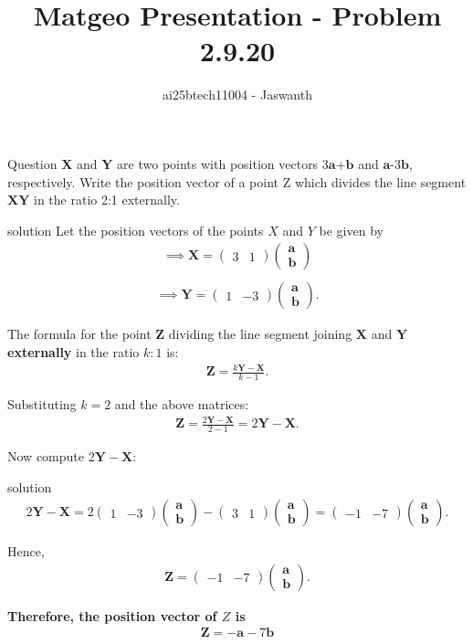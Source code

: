 \documentclass{beamer}
\title{Matgeo Presentation - Problem 2.9.20}
\author{ai25btech11004 - Jaswanth}
\numberwithin{equation}{section}
\theoremstyle{remark}
\newcommand{\myvec}[1]{\ensuremath{\begin{pmatrix}#1\end{pmatrix}}}
\let\vec\mathbf
\begin{document}
\frame{\titlepage}
\begin{frame}{Question}
$\vec{X}$ and  $\vec{Y}$ are two points with position vectors $3\vec{a}$+$\vec{b}$  and  $\vec{a}$-$3\vec{b}$, respectively. Write the position vector of a point Z  which divides the line segment  $\vec{XY}$ in the ratio 2:1 externally.\\
\end{frame}
\begin{frame}{solution}
Let the position vectors of the points $X$ and $Y$ be given by
\begin{align}
  \implies  \vec{X} = \myvec{3 & 1}
\myvec{\vec{a} \\ \vec{b}}\\
\end{align}
\begin{align}
\implies \vec{Y} = 
\myvec{1 & -3}
\myvec{\vec{a} \\ \vec{b}}.
\end{align}

\vspace{1em}

The formula for the point $\mathbf{Z}$ dividing the line segment joining $\vec{X}$ and $\vec{Y}$ \textbf{externally} in the ratio $k:1$ is:
\begin{align}
\vec{Z} = \frac{k\vec{Y} - \vec{X}}{k - 1}.
\end{align}

Substituting $k = 2$ and the above matrices:
\begin{align}
\vec{Z} = \frac{2\vec{Y} - \vec{X}}{2 - 1}
= 2\vec{Y} - \vec{X}.
\end{align}

Now compute $2\vec{Y} - \vec{X}$:
\end{frame}
\begin{frame}{solution}
\begin{align}
2\vec{Y} - \vec{X} = 
2\myvec{1 & -3}
       \myvec{\vec{a} \\ \vec{b}}
-
\myvec{3 & 1}
      \myvec{\vec{a} \\ \vec{b}}
=
\myvec{-1 & -7}
     \myvec{\vec{a} \\ \vec{b}}.
\end{align}

Hence,
\begin{align}
\vec{Z} = 
\myvec{-1 & -7}
\myvec{\vec{a} \\ \vec{b}}
.
\end{align}

\noindent
\textbf{Therefore, the position vector of $Z$ is}
\begin{align}
\boxed{\vec{Z} = 
-\vec{a}-7\vec{b}}
\end{align}

\end{frame}
\end{document}
